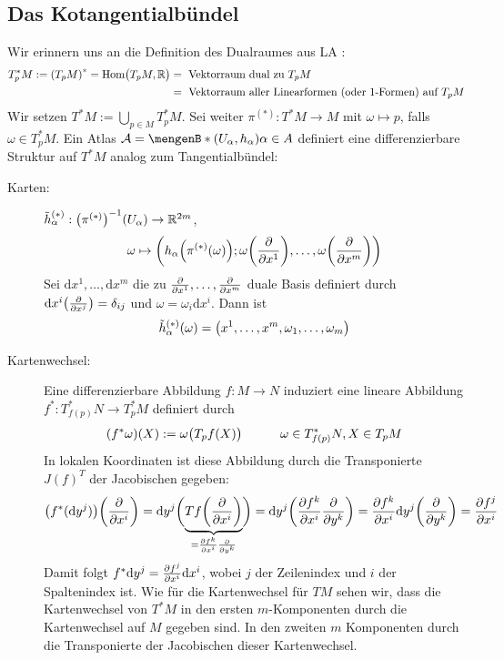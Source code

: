 \subsection{Das Kotangentialbündel} %
\label{sub:42}
Wir erinnern uns an die Definition des Dualraumes aus LA :
\begin{align*}
	T_p^* M := \enbrace*{T_pM}^* = \Hom\enbrace[\big]{T_pM, \mathds{R}} &= \text{ Vektorraum dual zu } T_p M  \\
	&= \text{ Vektorraum aller Linearformen (oder 1-Formen) auf } T_pM
\end{align*}
Wir setzen $T^*M := \bigcup_{p \in M} T_p^* M$. Sei weiter $\pi^{(*)} : T^*M \to M$ mit $\omega \mapsto p$, falls $\omega \in T_p^* M$. Ein Atlas 
$\mathcal{A} = \set[(U_\alpha, h_\alpha)]{\alpha \in A}$ definiert eine differenzierbare Struktur auf $T^*M$ analog zum Tangentialbündel:
\begin{description}
	\item[Karten:] $\tilde{h}^{(*)}_\alpha : \enbrace*{\pi^{(*)}} ^{-1} (U_\alpha) \to \mathds{R}^{2m}$, 
	\[
		\omega \mapsto \enbrace*{h_\alpha \enbrace*{\pi^{(*)}(\omega)}; \omega \enbrace*{\diff{}{x^1}}, \ldots , \omega \enbrace*{\diff{}{x^m} }   } 
	\]
	Sei $\mathrm{d}x^1, \ldots , \mathrm{d}x^m$ die zu $\diff{}{x^1}, \ldots , \diff{}{x^m}$ duale Basis definiert durch 
	$\mathrm{d}x^i \enbrace*{\diff{}{x^j} } = \delta_{ij} $ und $\omega= \omega_i \mathrm{d}x^i$. Dann ist
	\[
		\tilde{h}_\alpha^{(*)} (\omega) = \enbrace*{x^1, \ldots, x^m, \omega_1, \ldots , \omega_m} 
	\]
	\item[Kartenwechsel:] Eine differenzierbare Abbildung $f : M \to N$ induziert eine lineare Abbildung $f^* : T^*_{f(p)}N \to T^*_pM$ definiert durch 
	\[
		(f^* \omega)(X) := \omega \enbrace[\big]{T_p f(X)} \qquad  \quad \omega \in T_{f(p)}^*N, X \in T_pM
	\]
	In lokalen Koordinaten ist diese Abbildung durch die Transponierte $J(f)^T$ der Jacobischen gegeben:
	\begin{align*}
		\enbrace*{f^*(\mathrm{d}y^j)} \enbrace*{\diff{}{x^i} } = \mathrm{d}y^j \enbrace[\bigg]{\underbrace{T f \enbrace*{\diff{}{x^i} }}_{= \diff{f^k}{x^i} \diff{}{y^k}} } 
		= \mathrm{d}y^j \enbrace*{\diff{f^k}{x^i} \diff{}{y^k}} = \diff{f^k}{x^i} \mathrm{d}y^j \enbrace*{\diff{}{y^k} } = \diff{f^j}{x^i}    
	\end{align*}
	Damit folgt $f^* \mathrm{d}y^j = \diff{f^j}{x^i} \mathrm{d} x^i $, wobei $j$ der Zeilenindex und $i$ der Spaltenindex ist. Wie für die Kartenwechsel für $TM$ sehen wir,
	dass die Kartenwechsel von $T^*M$ in den ersten $m$-Komponenten durch die Kartenwechsel auf $M$ gegeben sind. In den zweiten $m$ Komponenten durch die Transponierte 
	der Jacobischen dieser Kartenwechsel. 
\end{description}

